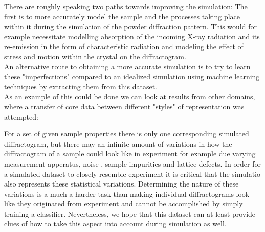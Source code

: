 There are roughly speaking two paths towards improving the simulation: The first is to more accurately model the sample and the processes taking place within it during the simulation of the powder diffraction pattern. This would for example necessitate modelling absorption of the incoming X-ray radiation and its re-emission in the form of characteristic radiation and modeling the effect of stress and motion within the crystal on the diffractogram. \\
An alternative route to obtaining a more accurate simulation is to try to learn these "imperfections" compared to an idealized simulation using machine learning techniques by extracting them from this dataset. \\
As an example of this could be done we can look at results from other domains, where a transfer of core data between different "styles" of representation was attempted:




For a set of given sample properties there is only one corresponding simulated diffractogram, but there may an infinite amount of variations in how the diffractogram of a sample could look like in experiment for example due varying measurement apperatus, noise
, sample impurities and lattice defects.
In order for a simulated dataset to closely resemble experiment it is critical that the simulatio also represents these
statistical variations.
Determining the nature of these variations is a much a harder task than making individual diffractograms look like they
originated from experiment and cannot be accomplished by simply training a classifier.
Nevertheless, we hope that this dataset can at least provide clues of how to take this aspect into account during
simulation as well.\\

